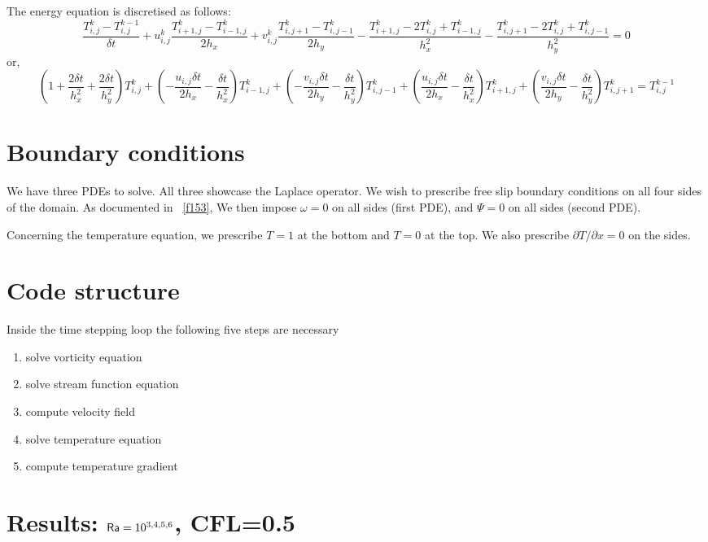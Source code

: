 The energy equation is discretised as follows:
\[
\frac{T_{i,j}^k-T_{i,j}^{k-1}}{\delta t} 
+ u^k_{i,j} \frac{T^k_{i+1,j}-T^k_{i-1,j}}{2h_x}
+ v^k_{i,j} \frac{T^k_{i,j+1}-T^k_{i,j-1}}{2h_y}
- \frac{T^k_{i+1,j}-2T^k_{i,j}+T^k_{i-1,j}}{h_x^2}
- \frac{T^k_{i,j+1}-2T^k_{i,j}+T^k_{i,j-1}}{h_y^2}
=0
\]
or,
\[
\left(1 +\frac{2 \delta t}{h_x^2} +\frac{2 \delta t}{h_y^2} \right)  T^k_{i,j}+
\left(-\frac{u_{i,j} \delta t}{2h_x} -\frac{\delta t}{h_x^2} \right) T^k_{i-1,j}+
\left(-\frac{v_{i,j} \delta t}{2h_y} -\frac{\delta t}{h_y^2} \right) T^k_{i,j-1}+
\left(\frac{u_{i,j} \delta t}{2h_x} -\frac{\delta t}{h_x^2} \right)  T^k_{i+1,j}+
\left(\frac{v_{i,j} \delta t}{2h_y} -\frac{\delta t}{h_y^2} \right)  T^k_{i,j+1}
=
T_{i,j}^{k-1}
\]

\section*{Boundary conditions}

We have three PDEs to solve. All three showcase the 
Laplace operator. We wish to prescribe free slip 
boundary conditions on all four sides of the domain. 
As documented in \stone~\ref{f153}, 
We then impose $\omega=0$ on all sides (first PDE), 
and $\Psi=0$ on all sides (second PDE). 

Concerning the temperature equation, 
we prescribe $T=1$ at the bottom and $T=0$ at the top. 
We also prescribe $\partial T/\partial x=0$ on the sides.

\section*{Code structure}

Inside the time stepping loop the following five steps are necessary
\begin{enumerate}
\item solve vorticity equation
\item solve stream function equation
\item compute velocity field
\item solve temperature equation
\item compute temperature gradient
\end{enumerate}

\newpage
\section*{Results: ${\mathsf{Ra}}=10^{3,4,5,6}$, CFL=0.5}

